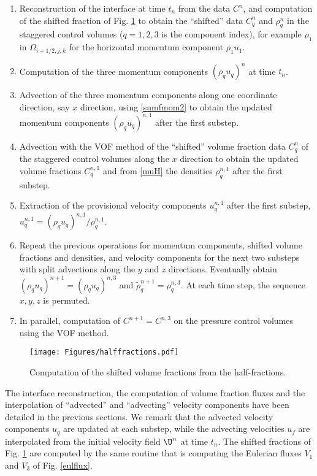 \begin{enumerate}
\item Reconstruction of the interface at time $t_n$ from the data $C^{n}$,
and computation of the shifted fraction of Fig. \ref{halffractions} to obtain
the ``shifted'' data $C^{n}_q$ and $\rho^{n}_q$ in the staggered control volumes
($q=1,2,3$ is the component index), for example $\rho_1$ in $\Omega_{i+1/2,j,k}$ for the 
horizontal momentum component $\rho_1 u_1$.
\item Computation of the three momentum components $(\rho_q u_q)^{n}$
at time $t_n$.
\item Advection of the three momentum components along one coordinate direction,
say $x$ direction, using \eqref{sumfmom2} to obtain the updated momentum components 
$(\rho_q u_q)^{n,1}$ after the first substep.
\item Advection with the VOF method of the ``shifted'' volume fraction data $C^{n}_q$ 
of the staggered control volumes along the $x$ direction to obtain the updated volume 
fractions $C^{n,1}_q$ and from \eqref{muH} the densities $\rho_q^{n,1}$ after the first 
substep. 
\item Extraction of the provisional velocity components $u_q^{n,1}$
after the first substep, $u_q^{n,1} = (\rho_q u_q)^{n,1}/\rho_q^{n,1}$.
\item Repeat the previous operations for momentum components, shifted
volume fractions and densities, and velocity components for the next two substeps
with split advections along the $y$ and $z$ directions.
Eventually obtain $(\rho_q u_q)^{n+1} = (\rho_q u_q)^{n,3}$ and 
$\tilde \rho_q^{n+1} = \rho_q^{n,3}$. At each time step, the sequence $x, y, z$
is permuted. 
\item In parallel, computation of $C^{n+1} = C^{n,3}$ on the pressure control volumes using
the VOF method. 
\end{enumerate}

\begin{figure}
\begin{center}
    \texttt{[image: Figures/halffractions.pdf]}
\end{center}
\caption{Computation of the shifted volume fractions from the half-fractions.}
\label{halffractions}
\end{figure}

The interface reconstruction, the computation of volume fraction fluxes and the 
interpolation of ``advected'' and ``advecting'' velocity components have been 
detailed in the previous sections. 
We remark that the advected velocity components $u_q$ are updated at each substep,
while the advecting velocities $u_f$ are interpolated from the initial
velocity field $\U^n$ at time $t_n$. The shifted fractions of Fig. \ref{halffractions}
are computed by the same routine that is computing the Eulerian fluxes $V_1$ and
$V_3$ of Fig. \ref{eulflux}.

